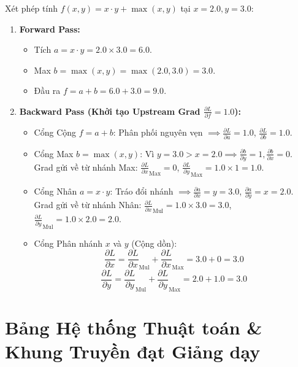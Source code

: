 \documentclass[11pt,a4paper]{article}
\begin{document}
\begin{examplebox}
Xét phép tính $f(x, y) = x \cdot y + \max(x, y)$ tại $x = 2.0, y = 3.0$:
\begin{enumerate}
    \item \textbf{Forward Pass:}
    \begin{itemize}
        \item Tích $a = x \cdot y = 2.0 \times 3.0 = 6.0$.
        \item Max $b = \max(x, y) = \max(2.0, 3.0) = 3.0$.
        \item Đầu ra $f = a + b = 6.0 + 3.0 = 9.0$.
    \end{itemize}
    
    \item \textbf{Backward Pass (Khởi tạo Upstream Grad $\frac{\partial L}{\partial f} = 1.0$):}
    \begin{itemize}
        \item Cổng Cộng $f = a + b$: Phân phối nguyên vẹn $\implies \frac{\partial L}{\partial a} = 1.0$, $\frac{\partial L}{\partial b} = 1.0$.
        \item Cổng Max $b = \max(x, y)$: Vì $y = 3.0 > x = 2.0 \implies \frac{\partial b}{\partial y} = 1, \frac{\partial b}{\partial x} = 0$.
        Grad gửi về từ nhánh Max: $\frac{\partial L}{\partial x}_{\text{Max}} = 0$, $\frac{\partial L}{\partial y}_{\text{Max}} = 1.0 \times 1 = 1.0$.
        \item Cổng Nhân $a = x \cdot y$: Tráo đổi nhánh $\implies \frac{\partial a}{\partial x} = y = 3.0$, $\frac{\partial a}{\partial y} = x = 2.0$.
        Grad gửi về từ nhánh Nhân: $\frac{\partial L}{\partial x}_{\text{Mul}} = 1.0 \times 3.0 = 3.0$, $\frac{\partial L}{\partial y}_{\text{Mul}} = 1.0 \times 2.0 = 2.0$.
        \item Cổng Phân nhánh $x$ và $y$ (Cộng dồn):
        $$\frac{\partial L}{\partial x} = \frac{\partial L}{\partial x}_{\text{Mul}} + \frac{\partial L}{\partial x}_{\text{Max}} = 3.0 + 0 = \mathbf{3.0}$$
        $$\frac{\partial L}{\partial y} = \frac{\partial L}{\partial y}_{\text{Mul}} + \frac{\partial L}{\partial y}_{\text{Max}} = 2.0 + 1.0 = \mathbf{3.0}$$
    \end{itemize}
\end{enumerate}
\end{examplebox}

\newpage
\section{Bảng Hệ thống Thuật toán \& Khung Truyền đạt Giảng dạy}
\end{document}
